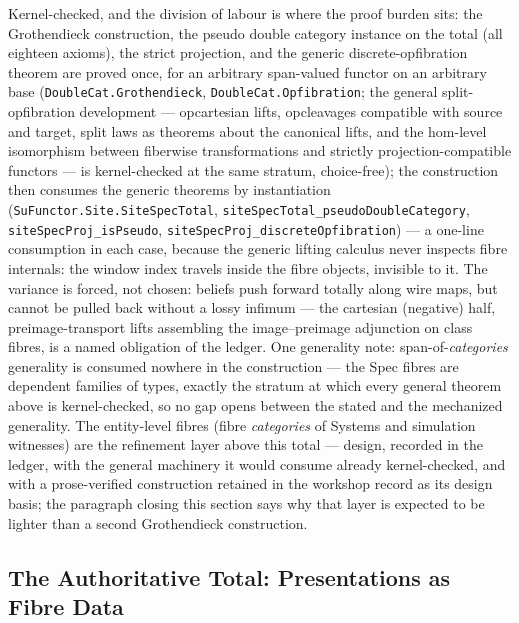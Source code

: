 \begin{remark}
\label{rem:su-assembly-mechanized}
Kernel-checked, and the division of labour is
where the proof burden sits: the Grothendieck construction, the pseudo double
category instance on the total (all eighteen axioms), the strict
projection, and the generic discrete-opfibration theorem are proved
once, for an arbitrary span-valued functor on an arbitrary base
(\texttt{DoubleCat.Grothendieck},
\texttt{DoubleCat.Opfibration}; the general split-opfibration
development --- opcartesian lifts, opcleavages compatible with
source and target, split laws as theorems about the canonical
lifts, and the hom-level isomorphism between fiberwise
transformations and strictly projection-compatible functors --- is
kernel-checked at the same stratum, choice-free); the construction then
consumes the generic theorems by instantiation
(\texttt{SuFunctor.Site.SiteSpecTotal},
\texttt{siteSpecTotal\_pseudoDoubleCategory},
\texttt{siteSpecProj\_isPseudo},
\texttt{siteSpecProj\_discreteOpfibration}) --- a one-line
consumption in each case, because the generic lifting calculus
never inspects fibre internals: the window index travels inside the
fibre objects, invisible to it. The variance is forced, not
chosen: beliefs push forward totally along wire maps, but cannot
be pulled back without a lossy infimum --- the cartesian
(negative) half, preimage-transport lifts assembling the
image--preimage adjunction on class fibres, is a named obligation
of the ledger. One generality note: span-of-\emph{categories}
generality is consumed
nowhere in the construction --- the Spec fibres are dependent
families of types, exactly the stratum at which every general
theorem above is kernel-checked, so no gap opens between the stated
and the mechanized generality. The entity-level fibres
(fibre \emph{categories} of Systems and simulation witnesses) are
the refinement layer above this total ---
design, recorded in the ledger, with the general machinery it would
consume already
kernel-checked, and with a prose-verified
construction retained in the workshop record as its design basis;
the paragraph closing this section says why that layer is expected
to be lighter than a second Grothendieck construction.
\end{remark}

\subsection{The Authoritative Total: Presentations as Fibre Data}

